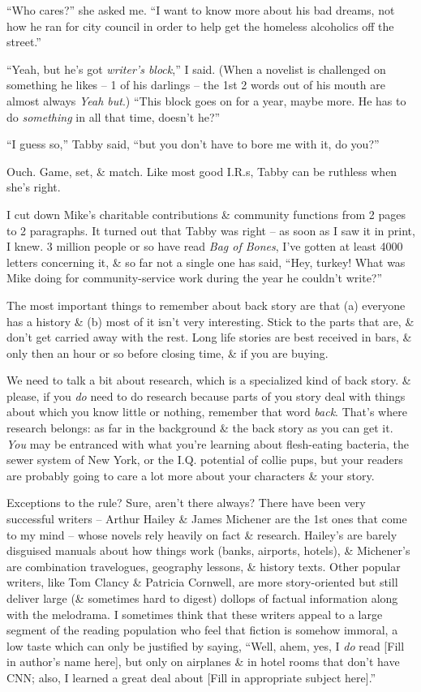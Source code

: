 \documentclass{article}
\numberwithin{equation}{section}
\begin{document}
``Who cares?'' she asked me. ``I want to know more about his bad dreams, not how he ran for city council in order to help get the homeless alcoholics off the street.''

``Yeah, but he's got \textit{writer's block},'' I said. (When a novelist is challenged on something he likes -- 1 of his darlings -- the 1st 2 words out of his mouth are almost always \textit{Yeah but}.) ``This block goes on for a year, maybe more. He has to do \textit{something} in all that time, doesn't he?''

``I guess so,'' Tabby said, ``but you don't have to bore me with it, do you?''

Ouch. Game, set, \& match. Like most good I.R.s, Tabby can be ruthless when she's right.

I cut down Mike's charitable contributions \& community functions from 2 pages to 2 paragraphs. It turned out that Tabby was right -- as soon as I saw it in print, I knew. 3 million people or so have read \textit{Bag of Bones}, I've gotten at least 4000 letters concerning it, \& so far not a single one has said, ``Hey, turkey! What was Mike doing for community-service work during the year he couldn't write?''

The most important things to remember about back story are that (a) everyone has a history \& (b) most of it isn't very interesting. Stick to the parts that are, \& don't get carried away with the rest. Long life stories are best received in bars, \& only then an hour or so before closing time, \& if you are buying.

 We need to talk a bit about research, which is a specialized kind of back story. \& please, if you \textit{do} need to do research because parts of you story deal with things about which you know little or nothing, remember that word \textit{back}. That's where research belongs: as far in the background \& the back story as you can get it. \textit{You} may be entranced with what you're learning about flesh-eating bacteria, the sewer system of New York, or the I.Q. potential of collie pups, but your readers are probably going to care a lot more about your characters \& your story.

Exceptions to the rule? Sure, aren't there always? There have been very successful writers -- Arthur Hailey \& James Michener are the 1st ones that come to my mind -- whose novels rely heavily on fact \& research. Hailey's are barely disguised manuals about how things work (banks, airports, hotels), \& Michener's are combination travelogues, geography lessons, \& history texts. Other popular writers, like Tom Clancy \& Patricia Cornwell, are more story-oriented but still deliver large (\& sometimes hard to digest) dollops of factual information along with the melodrama. I sometimes think that these writers appeal to a large segment of the reading population who feel that fiction is somehow immoral, a low taste which can only be justified by saying, ``Well, ahem, yes, I \textit{do} read [Fill in author's name here], but only on airplanes \& in hotel rooms that don't have CNN; also, I learned a great deal about [Fill in appropriate subject here].''
\end{document}
